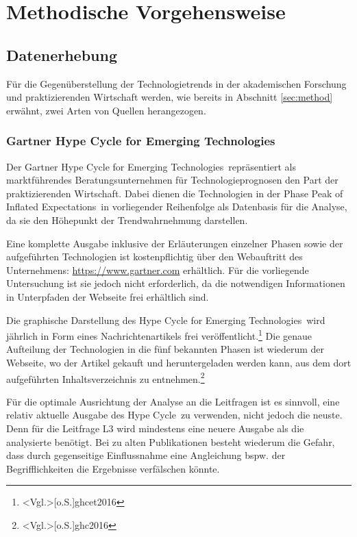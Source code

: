 \section{Methodische Vorgehensweise}
\subsection{Datenerhebung}
Für die Gegenüberstellung der Technologietrends in der akademischen Forschung und praktizierenden Wirtschaft werden, wie bereits in Abschnitt \ref{sec:method} erwähnt, zwei Arten von Quellen herangezogen.

\subsubsection{Gartner Hype Cycle for Emerging Technologies}\label{sec:ghcet}
Der \glqq Gartner Hype Cycle for Emerging Technologies\grqq~repräsentiert als markt\-führendes Beratungsunternehmen für Technologieprognosen den Part der praktizierenden Wirtschaft. Dabei dienen die Technologien in der Phase \glqq Peak of Inflated Expectations\grqq~in vorliegender Reihenfolge als Datenbasis für die Analyse, da sie den Höhepunkt der Trendwahrnehmung darstellen.

Eine komplette Ausgabe inklusive der Erläuterungen einzelner Phasen sowie der aufgeführten Technologien ist kostenpflichtig über den Webauftritt des Unternehmens: \url{https://www.gartner.com} erhältlich. Für die vorliegende Untersuchung ist sie jedoch nicht erforderlich, da die notwendigen Informationen in Unterpfaden der Webseite frei erhältlich sind.

Die graphische Darstellung des \glqq Hype Cycle for Emerging Technologies\grqq~wird jährlich in Form eines Nachrichtenartikels frei veröffentlicht.\footnote{\citeNP<Vgl.>[o.S.]{ghcet2016}}
Die genaue Aufteilung der Technologien in die fünf bekannten Phasen ist wiederum der Webseite, wo der Artikel gekauft und heruntergeladen werden kann, aus dem dort aufgeführten Inhaltsverzeichnis zu entnehmen.\footnote{\citeNP<Vgl.>[o.S.]{ghc2016}}

Für die optimale Ausrichtung der Analyse an die Leitfragen ist es sinnvoll, eine relativ aktuelle Ausgabe des \glqq Hype Cycle\grqq~zu verwenden, nicht jedoch die neuste. Denn für die Leitfrage L3 wird mindestens eine neuere Ausgabe als die analysierte benötigt. Bei zu alten Publikationen besteht wiederum die Gefahr, dass durch gegenseitige Einflussnahme eine Angleichung bspw. der Begrifflichkeiten die Ergebnisse verfälschen könnte.

